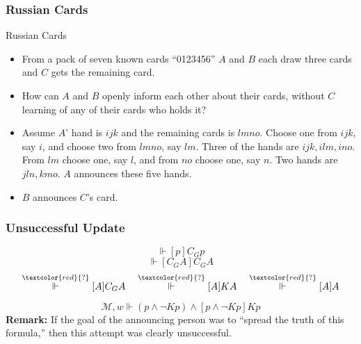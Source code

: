 \documentclass[UTF8,11pt,colorlinks,compress,openany]{beamer}%
\begin{document}
\begin{frame}\frametitle{Russian Cards}
\begin{block}{Russian Cards}
\begin{itemize}
	\item From a pack of seven known cards ``0123456'' $A$ and $B$ each draw three cards and $C$ gets the remaining card.
	\item How can $A$ and $B$ openly inform each other about their cards, without $C$ learning of any of their cards who holds it?
\end{itemize}
\end{block}
\begin{itemize}
	\item Assume $A$' hand is $ijk$ and the remaining cards is $lmno$. Choose one from $ijk$, say $i$, and choose two from $lmno$, say $lm$. Three of the hands are $ijk,ilm,ino$. From $lm$ choose one, say $l$, and from $no$ choose one, say $n$. Two hands are $jln,kmo$. $A$ announces these five hands.
	\item $B$ announces $C$'s card.
\end{itemize}
\end{frame}

\begin{frame}\frametitle{Unsuccessful Update}
\[\Vdash[p]C_Gp\]
\[\Vdash[C_GA]C_GA\]
\[\stackrel{\textcolor{red}{?}}{\Vdash} [A]C_GA\quad\stackrel{\textcolor{red}{?}}{\Vdash} [A]KA\quad\stackrel{\textcolor{red}{?}}{\Vdash} [A]A\]
\begin{center}
\end{center}
\[\mathcal{M},w\Vdash (p\wedge \neg Kp)\wedge \left[p\wedge \neg Kp\right]Kp\]
\textbf{Remark:} If the goal of the announcing person was to ``spread the truth of this formula,'' then this attempt was clearly unsuccessful.
\end{frame}
\end{document}
